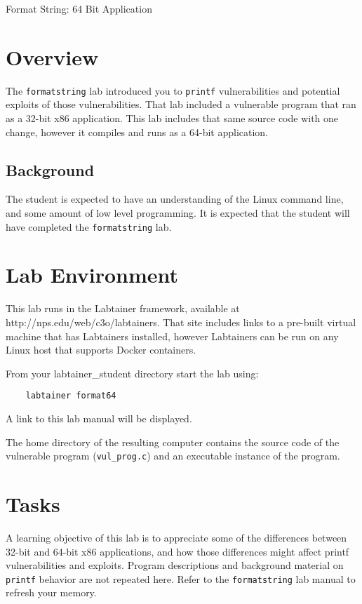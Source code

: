 


\begin{center}
{\LARGE Format String: 64 Bit Application}
\vspace{0.1in}\\
\end{center}

\section{Overview}
The {\tt formatstring} lab introduced you to {\tt printf} vulnerabilities and potential exploits of those
vulnerabilities.  That lab included a vulnerable program that ran as a 32-bit x86 application.  
This lab includes that same source code with one change, however it compiles and runs as a 64-bit application.

\subsection {Background}
The student is expected to have an understanding of the Linux command line, and some amount of low level programming.
It is expected that the student will have completed the {\tt formatstring} lab.

\section{Lab Environment}
\label{environment}
This lab runs in the Labtainer framework,
available at http://nps.edu/web/c3o/labtainers.
That site includes links to a pre-built virtual machine
that has Labtainers installed, however Labtainers can
be run on any Linux host that supports Docker containers.

From your labtainer_student directory start the lab using:
\begin{verbatim}
    labtainer format64
\end{verbatim}
\noindent A link to this lab manual will be displayed.  

The home directory of the resulting computer contains the source code of the vulnerable 
program ({\tt vul\_prog.c}) and an executable instance of the program.

\section{Tasks}

A learning objective of this lab is to appreciate some of the differences between 32-bit and 64-bit x86 applications,
and how those differences might affect printf vulnerabilities and exploits.  Program descriptions and background
material on {\tt printf} behavior are not repeated here.  Refer to the {\tt formatstring} lab manual to refresh
your memory.

